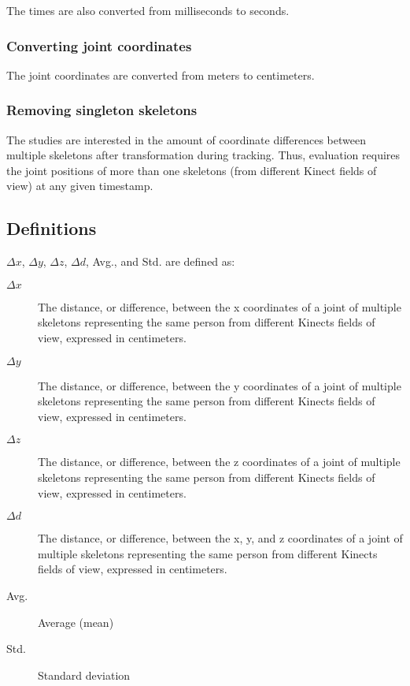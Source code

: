 The times are also converted from milliseconds to seconds.

\subsubsection{Converting joint coordinates}

The joint coordinates are converted from meters to centimeters.

\subsubsection{Removing singleton skeletons}

The studies are interested in the amount of coordinate differences between multiple skeletons after transformation during tracking. Thus, evaluation requires the joint positions of more than one skeletons (from different Kinect fields of view) at any given timestamp. 

\subsection{Definitions}

$\Delta x$, $\Delta y$, $\Delta z$, $\Delta d$, Avg., and Std. are defined as:

\begin{description}
  \item[$\Delta x$] The distance, or difference, between the x coordinates of a joint of multiple skeletons representing the same person from different Kinects fields of view, expressed in centimeters.
  \item[$\Delta y$] The distance, or difference, between the y coordinates of a joint of multiple skeletons representing the same person from different Kinects fields of view, expressed in centimeters.
  \item[$\Delta z$] The distance, or difference, between the z coordinates of a joint of multiple skeletons representing the same person from different Kinects fields of view, expressed in centimeters.
  \item[$\Delta d$] The distance, or difference, between the x, y, and z coordinates of a joint of multiple skeletons representing the same person from different Kinects fields of view, expressed in centimeters.
  \item[Avg.] Average (mean)
  \item[Std.] Standard deviation
\end{description}

